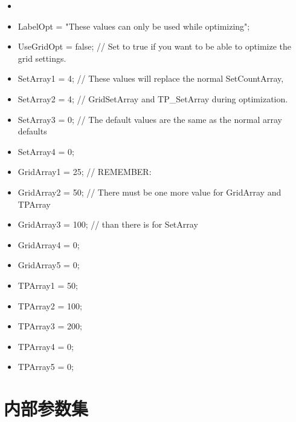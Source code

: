 \begin{itemize}
\item 
\item LabelOpt            = "These values can only be used while optimizing";
\item UseGridOpt          = false;    // Set to true if you want to be able to optimize the grid settings.
\item SetArray1           = 4;        // These values will replace the normal SetCountArray,
\item SetArray2           = 4;        // GridSetArray and TP\_SetArray during optimization.
\item SetArray3           = 0;        // The default values are the same as the normal array defaults
\item SetArray4           = 0;
\item GridArray1          = 25;       // REMEMBER:
\item GridArray2          = 50;       // There must be one more value for GridArray and TPArray
\item GridArray3          = 100;      // than there is for SetArray
\item GridArray4          = 0;
\item GridArray5          = 0;
\item TPArray1            = 50;
\item TPArray2            = 100;
\item TPArray3            = 200;
\item TPArray4            = 0;
\item TPArray5            = 0;


\end{itemize}

\section{内部参数集}

